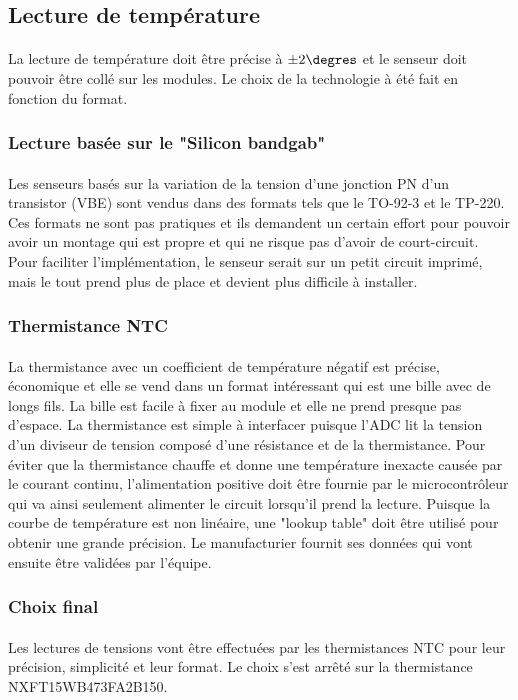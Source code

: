 

\subsection{Lecture de température}
	\paragraph*{}
	La lecture de température doit être précise à $\pm 2\degres$ et le senseur doit pouvoir être collé sur les modules. Le choix de la technologie à été fait en fonction du format. 
	
	\subsubsection*{Lecture basée sur le "Silicon bandgab"}
	\paragraph*{}
	Les senseurs basés sur la variation de la tension d'une jonction PN d'un transistor (VBE) sont vendus dans des formats tels que le TO-92-3 et le TP-220. Ces formats ne sont pas pratiques et ils demandent un certain effort pour pouvoir avoir un montage qui est propre et qui ne risque pas d'avoir de court-circuit. Pour faciliter l'implémentation, le senseur serait sur un petit circuit imprimé, mais le tout prend plus de place et devient plus difficile à installer.
	
	\subsubsection*{Thermistance NTC}
	\paragraph*{}
	La thermistance avec un coefficient de température négatif est précise, économique et elle se vend dans un format intéressant qui est une bille avec de longs fils. La bille est facile à fixer au module et elle ne prend presque pas d'espace. La thermistance est simple à interfacer puisque l'ADC lit la tension d'un diviseur de tension composé d'une résistance et de la thermistance. Pour éviter que la thermistance chauffe et donne une température inexacte causée par le courant continu, l'alimentation positive doit être fournie par le microcontrôleur qui va ainsi seulement alimenter le circuit lorsqu'il prend la lecture. Puisque la courbe de température est non linéaire, une "lookup table" doit être utilisé pour obtenir une grande précision. Le manufacturier fournit ses données qui vont ensuite être validées par l'équipe.  
	
	\subsubsection*{Choix final}
	\paragraph*{}
	Les lectures de tensions vont être effectuées par les thermistances NTC pour leur précision, simplicité et leur format. Le choix s'est arrêté sur la thermistance NXFT15WB473FA2B150.